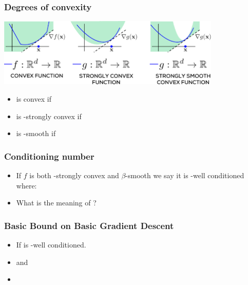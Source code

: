\documentclass[handout]{beamer}
\begin{document}
\begin{frame}
  \frametitle{Degrees of convexity}
  \begin{center}
  \includegraphics[width=0.8\textwidth]{figures/StrongConvexity.png}
\end{center}
  \begin{itemize}
  \item {} is convex if
  \item {} is \R{$\alpha$}-strongly convex if
  \item {} is \R{$\beta$}-smooth if
  \end{itemize}

\end{frame}

\begin{frame}
  \frametitle{Conditioning number}
  \begin{itemize}
    \item If $f$ is both \R{$\alpha$}-strongly convex and
      {$\beta$}-smooth we say it is \R{$\gamma$}-well conditioned where:
      \item What is the meaning of ?
  \end{itemize}
\end{frame}

\begin{frame}
  \frametitle{Basic Bound on Basic Gradient Descent}
  \begin{itemize}
  \item If  is \R{$\gamma$}-well conditioned.
  \item and 
  \item {}
  \end{itemize}
\end{frame}
\end{document}
